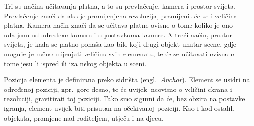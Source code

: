 Tri su načina učitavanja platna, a to su prevlačenje, kamera i prostor svijeta. Prevlačenje znači da ako je promijenjena rezolucija, promijenit će se i veličina platna. Kamera način znači da se učitava platno ovisno o tome koliko je ono udaljeno od određene kamere i o postavkama kamere. A treći način, prostor svijeta, je kada se platno ponaša kao bilo koji drugi objekt unutar scene, gdje moguće je ručno mijenjati veličinu svih elemenata, te će se učitavati ovisno o tome jesu li ispred ili iza nekog objekta u sceni.

Pozicija elementa je definirana preko sidrišta (engl.~\textit{Anchor}). Element se usidri na određenoj poziciji, npr.~gore desno, te će uvijek, neovisno o veličini ekrana i rezoluciji, gravitirati toj poziciji. Tako smo sigurni da će, bez obzira na postavke igranja, element uvijek biti prisutan na očekivanoj poziciji. Kao i kod ostalih objekata, promjene nad roditeljem, utječu i na djecu.

